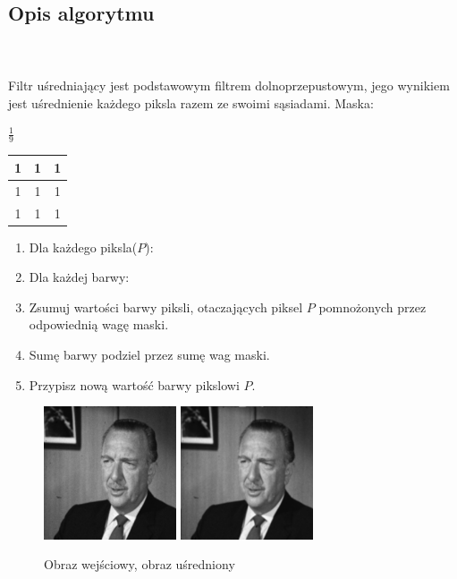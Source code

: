 \documentclass[final,a4paper,openany,12pt]{mwbk}
\begin{document}
\subsection*{Opis algorytmu}
\hfill
\\\\
\indent Filtr uśredniający jest podstawowym filtrem dolnoprzepustowym, jego wynikiem jest uśrednienie każdego piksla razem ze swoimi sąsiadami. Maska:
\begin{center}
	$\frac{1}{9}$ 
	\begin{tabular}{|c|c|c|}
		\hline
		1 & 1 & 1\\
		\hline
		1 & 1 & 1\\
		\hline
		1 & 1 & 1\\
		\hline
	\end{tabular}
\end{center}

\begin{enumerate}
	\item Dla każdego piksla($P$):
	\item Dla każdej barwy:
	\item Zsumuj wartości barwy piksli, otaczających piksel $P$ pomnożonych przez odpowiednią wagę maski.
	\item Sumę barwy podziel przez sumę wag maski.
	\item Przypisz nową wartość barwy pikslowi $P$.
\end{enumerate}

\begin{figure}[H]
	\begin{center}
		\includegraphics[width=0.35\textwidth]{gentelman_gray}
		\includegraphics[width=0.35\textwidth]{gentelman_gray_lowpassAvg_result}
	\end{center}
	\caption{Obraz wejściowy, obraz uśredniony}
\end{figure}
\end{document}
